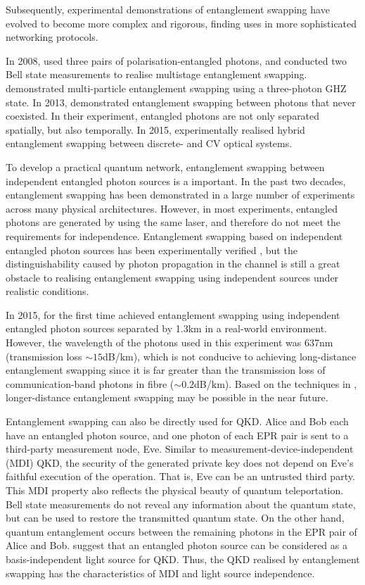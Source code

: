 \documentclass[aps, rmp, twocolumn, amsmath, amssymb, nofootinbib, superscriptaddress, longbibliography, floatfix, table-of-contents, eqsecnum]{revtex4-1}
\begin{document}
Subsequently, experimental demonstrations of entanglement swapping have evolved to become more complex and rigorous, finding uses in more sophisticated networking protocols.

In 2008, \cite{bib:PRL_101_080403} used three pairs of polarisation-entangled photons, and conducted two Bell state measurements to realise multistage entanglement swapping. \cite{bib:PRL_103_020501} demonstrated multi-particle entanglement swapping using a three-photon GHZ state. In 2013, \cite{bib:PRL_110_210403} demonstrated entanglement swapping between photons that never coexisted. In their experiment, entangled photons are not only separated spatially, but also temporally. In 2015, \cite{bib:PRL_114_100501} experimentally realised hybrid entanglement swapping between discrete- and CV optical systems.

To develop a practical quantum network, entanglement swapping between independent entangled photon sources is a important. In the past two decades, entanglement swapping has been demonstrated in a large number of experiments across many physical architectures. However, in most experiments, entangled photons are generated by using the same laser, and therefore do not meet the requirements for independence. Entanglement swapping based on independent entangled photon sources has been experimentally verified \cite{bib:PRL_96_110501, bib:Nat_Phys_3_692, bib:PRA_79_040302}, but the distinguishability caused by photon propagation in the channel is still a great obstacle to realising entanglement swapping using independent sources under realistic conditions.

In 2015, \cite{bib:Nat_526_682} for the first time achieved entanglement swapping using independent entangled photon sources separated by 1.3km in a real-world environment. However, the wavelength of the photons used in this experiment was 637nm (transmission loss \mbox{$\sim 15$dB/km}), which is not conducive to achieving long-distance entanglement swapping since it is far greater than the transmission loss of communication-band photons in fibre (\mbox{$\sim 0.2$dB/km}). Based on the techniques in \cite{bib:Nat_phot_10_671, bib:Nat_phot_10_676}, longer-distance entanglement swapping may be possible in the near future.

Entanglement swapping can also be directly used for QKD. Alice and Bob each have an entangled photon source, and one photon of each EPR pair is sent to a third-party measurement node, Eve. Similar to measurement-device-independent (MDI) QKD, the security of the generated private key does not depend on Eve's faithful execution of the operation. That is, Eve can be an untrusted third party. This MDI property also reflects the physical beauty of quantum teleportation. Bell state measurements do not reveal any information about the quantum state, but can be used to restore the transmitted quantum state. On the other hand, quantum entanglement occurs between the remaining photons in the EPR pair of Alice and Bob. \cite{bib:PRL_90_057902, bib:NJP_10_2008} suggest that an entangled photon source can be considered as a basis-independent light source for QKD. Thus, the QKD realised by entanglement swapping has the characteristics of MDI and light source independence.
\end{document}
